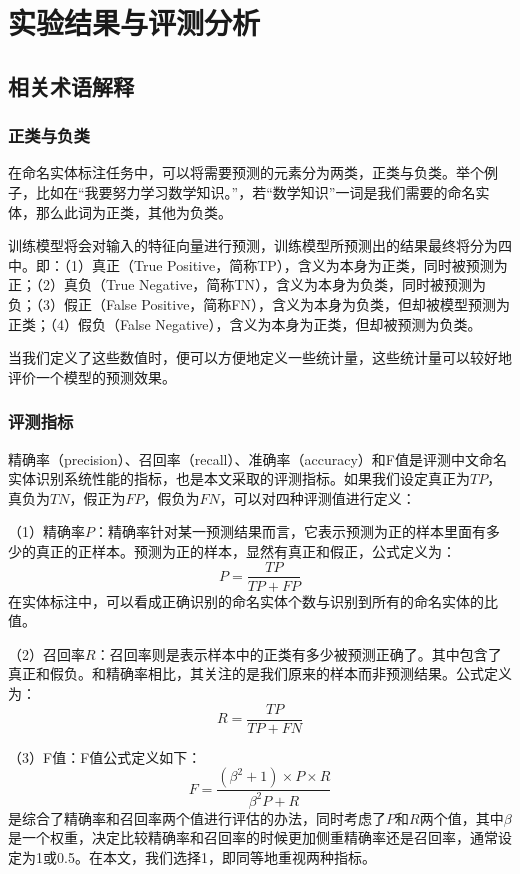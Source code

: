 
\chapter{实验结果与评测分析}
\section{相关术语解释}
\subsection{正类与负类}
在命名实体标注任务中，可以将需要预测的元素分为两类，正类与负类。举个例子，比如在“我要努力学习数学知识。”，若“数学知识”一词是我们需要的命名实体，那么此词为正类，其他为负类。  

训练模型将会对输入的特征向量进行预测，训练模型所预测出的结果最终将分为四中。即：（1）真正（True Positive，简称TP），含义为本身为正类，同时被预测为正；（2）真负（True Negative，简称TN），含义为本身为负类，同时被预测为负；（3）假正（False Positive，简称FN），含义为本身为负类，但却被模型预测为正类；（4）假负（False Negative），含义为本身为正类，但却被预测为负类。

当我们定义了这些数值时，便可以方便地定义一些统计量，这些统计量可以较好地评价一个模型的预测效果。

\subsection{评测指标}

精确率（precision）、召回率（recall）、准确率（accuracy）和F值是评测中文命名实体识别系统性能的指标，也是本文采取的评测指标。如果我们设定真正为\(TP\)，真负为\(TN\)，假正为\(FP\)，假负为\(FN\)，可以对四种评测值进行定义：

（1）精确率\(P\)：精确率针对某一预测结果而言，它表示预测为正的样本里面有多少的真正的正样本。预测为正的样本，显然有真正和假正，公式定义为：\begin{equation}P = \frac{TP}{TP+FP}\end{equation}
在实体标注中，可以看成正确识别的命名实体个数与识别到所有的命名实体的比值。

（2）召回率\(R\)：召回率则是表示样本中的正类有多少被预测正确了。其中包含了真正和假负。和精确率相比，其关注的是我们原来的样本而非预测结果。公式定义为：\begin{equation} R = \frac{TP}{TP+FN}\end{equation}

（3）F值：F值公式定义如下：\begin{equation}F = \frac{(\beta^2 + 1) \times P \times R}{\beta^2P + R}\end{equation} 是综合了精确率和召回率两个值进行评估的办法，同时考虑了\(P\)和\(R\)两个值，其中\(\beta\)是一个权重，决定比较精确率和召回率的时候更加侧重精确率还是召回率，通常设定为1或0.5。在本文，我们选择1，即同等地重视两种指标。

